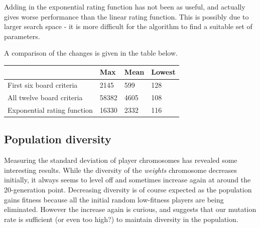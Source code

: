 \documentclass[a4paper,11pt]{article}
\begin{document}
Adding in the exponential rating function has not been as useful, and actually
gives worse performance than the linear rating function.
This is possibly due to larger search space - it is more difficult for the
algorithm to find a suitable set of parameters.

A comparison of the changes is given in the table below.

\begin{center}
  \begin{tabular}{l l l l}
    \hline
     & Max & Mean & Lowest \\
    \hline
    First six board criteria & 2145 & 599 & 128 \\
    All twelve board criteria & 58382 & 4605 & 108 \\
    Exponential rating function & 16330 & 2332 & 116 \\
    
  \end{tabular}
\end{center}

\subsection{Population diversity}

Measuring the standard deviation of player chromosomes has revealed some
interesting results.
While the diversity of the \emph{weights} chromosome decreases initially, it
always seems to level off and sometimes increase again at around the
20-generation point.
Decreasing diversity is of course expected as the population gains fitness
because all the initial random low-fitness players are being eliminated.
However the increase again is curious, and suggests that our mutation rate is
sufficient (or even too high?) to maintain diversity in the population.
\end{document}
